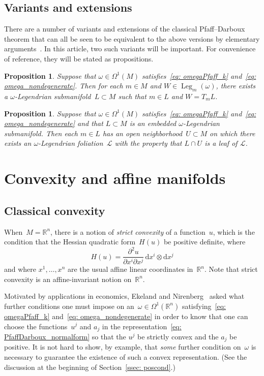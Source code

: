 \documentclass[10pt,a4paper]{amsart}
\renewcommand{\d}{\mathrm{d}}%
\newcommand{\cL}{{\mathcal L}}
\newcommand{\bbR}{{\mathbb R}}
\newcommand{\Leg}{\operatorname{Leg}}
\numberwithin{equation}{section}
\newtheorem{Proposition}[Theorem]{Proposition}
 { \theoremstyle{definition}
\newtheorem{Definition}[Theorem]{Definition}
\newtheorem{Note}[Theorem]{Note}
\newtheorem{Example}[Theorem]{Example}
\newtheorem{Remark}[Theorem]{Remark} }
\begin{document}
\subsection{Variants and extensions}
There are a number of variants and extensions
of the classical Pfaff--Darboux theorem
that can all be seen to be equivalent to the above versions
by elementary arguments~\cite[Chapter II, Section~3]{MR1083148}.
In this article, two such variants will be important.
For convenience of reference, they will be stated as propositions.

\begin{Proposition}\label{prop: Legfromtangent}
Suppose that $\omega\in\Omega^1(M)$ satisfies~\eqref{eq: omegaPfaff_k}
and~\eqref{eq: omega_nondegenerate}. Then for each $m\in M$
and $W\in\Leg_m(\omega)$,
there exists a $\omega$-Legendrian submanifold~$L\subset M$
such that $m\in L$ and $W = T_mL$.
\end{Proposition}

\begin{Proposition}\label{prop: folfromleg}
Suppose that $\omega\in\Omega^1(M)$ satisfies~\eqref{eq: omegaPfaff_k}
and~\eqref{eq: omega_nondegenerate} and that $L\subset M$
is an embedded $\omega$-Legendrian submanifold. Then each $m\in L$
has an open neighborhood~$U\subset M$ on which there exists
an $\omega$-Legendrian foliation~$\cL$ with the property that $L\cap U$
is a leaf of $\cL$.
\end{Proposition}


\section{Convexity and affine manifolds}

\subsection{Classical convexity}
When~$M=\bbR^n$, there is a notion of \emph{strict convexity}
of a function~$u$, which is the condition
that the Hessian quadratic form~$H(u)$ be positive definite, where
\begin{equation}\label{eq: flat_Hessian}
H(u) = {\frac{\partial^2 u}{\partial x^i\partial x^j}}
\,\d x^i\otimes\d x^j
\end{equation}
and where $x^1,\ldots,x^n$
are the usual affine linear coordinates in~$\bbR^n$.
Note that strict convexity is an affine-invariant notion on~$\bbR^n$.

Motivated by applications in economics,
Ekeland and Nirenberg~\cite{MR2023129}
asked what further conditions one must impose on an~$\omega\in\Omega^1(\bbR^n)$
satisfying~\eqref{eq: omegaPfaff_k} and~\eqref{eq: omega_nondegenerate}
in order to know that one can choose the functions~$u^j$
and $a_j$ in the representation~\eqref{eq: PfaffDarboux_normalform}
so that the $u^j$ be strictly convex and the $a_j$ be positive.
It is not hard to show, by example, that \emph{some}
further condition on~$\omega$ is necessary
to guarantee the existence of such a convex representation.
(See the discussion at the beginning of Section~\ref{ssec: poscond}.)
\end{document}
